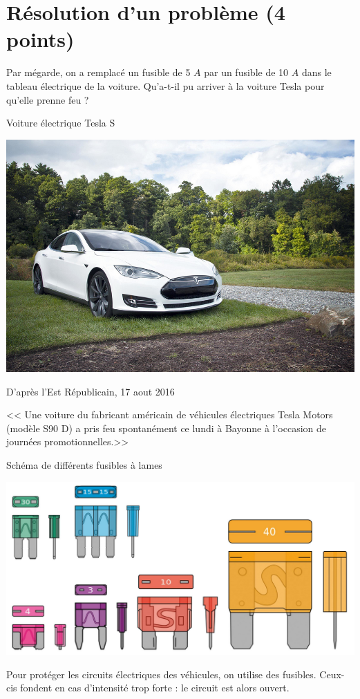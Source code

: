 \section{Résolution d'un problème (4 points)}

Par mégarde, on a remplacé un fusible de 5 $A$ par un fusible de 10 $A$ dans le tableau électrique de la voiture. Qu'a-t-il pu arriver à la voiture Tesla pour qu'elle prenne feu ?


	\begin{doc}[h!]
		\caption{Voiture électrique Tesla S\textregistered}
		
		\begin{center}
			\includegraphics[scale=0.35]{img/tesla}
		\end{center}
	\end{doc}
	
	\begin{doc}[h!]
		\caption{D'après l'Est Républicain, 17 aout 2016 }
		
		<< Une voiture du fabricant américain de véhicules électriques Tesla Motors (modèle S90 D) a pris feu spontanément ce lundi à Bayonne à l'occasion de journées promotionnelles.>>
	\end{doc}




\begin{doc}[h!]
	\caption{Schéma de différents fusibles à lames}
	
	\begin{center}
		\includegraphics[scale=0.35]{img/fusibles}
	\end{center}
	
	Pour protéger les circuits électriques des véhicules, on utilise des fusibles. Ceux-cis fondent en cas d'intensité trop forte : le circuit est alors ouvert.
\end{doc}